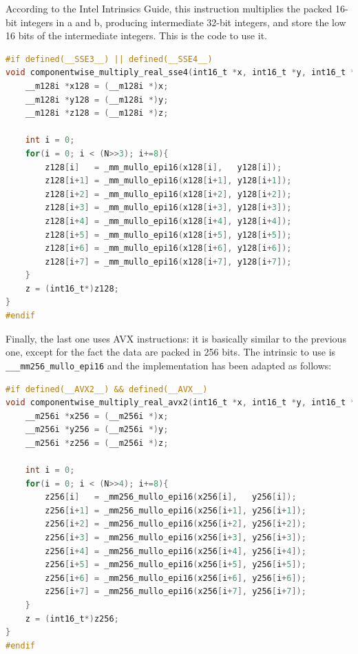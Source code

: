 \documentclass[paper=a4, fontsize=12pt]{scrartcl} %
\numberwithin{equation}{section}
\numberwithin{figure}{section}
\numberwithin{table}{section}
\begin{document}
According to the Intel Intrinsics Guide, this instruction multiplies the packed 16-bit integers
in a and b, producing intermediate 32-bit integers, and store the low 16 bits
of the intermediate integers.
This is the code to use it.
\newpage
\begin{lstlisting}[language=C, caption=SSE Implementation with 8-way loop unrolling]
#if defined(__SSE3__) || defined(__SSE4__)
void componentwise_multiply_real_sse4(int16_t *x, int16_t *y, int16_t *z, uint32_t N) {
    __m128i *x128 = (__m128i *)x;
    __m128i *y128 = (__m128i *)y;
    __m128i *z128 = (__m128i *)z;

    int i = 0;
    for(i = 0; i < (N>>3); i+=8){
        z128[i]   = _mm_mullo_epi16(x128[i],   y128[i]);
        z128[i+1] = _mm_mullo_epi16(x128[i+1], y128[i+1]);
        z128[i+2] = _mm_mullo_epi16(x128[i+2], y128[i+2]);
        z128[i+3] = _mm_mullo_epi16(x128[i+3], y128[i+3]);
        z128[i+4] = _mm_mullo_epi16(x128[i+4], y128[i+4]);
        z128[i+5] = _mm_mullo_epi16(x128[i+5], y128[i+5]);
        z128[i+6] = _mm_mullo_epi16(x128[i+6], y128[i+6]);
        z128[i+7] = _mm_mullo_epi16(x128[i+7], y128[i+7]);
    }
    z = (int16_t*)z128;
}
#endif
\end{lstlisting}

Finally, the last one uses AVX instructions: it is basically similar to the previous one, except
for the fact the data are packed in 256 bits. The intrinsic to use is \texttt{\_\_\_mm256\_mullo\_epi16}
and the implementation has been adapted as follows:
\begin{lstlisting}[language=C, caption=AVX2 Implementation with 8-way loop unrolling]
#if defined(__AVX2__) && defined(__AVX__)
void componentwise_multiply_real_avx2(int16_t *x, int16_t *y, int16_t *z, uint32_t N) {
    __m256i *x256 = (__m256i *)x;
    __m256i *y256 = (__m256i *)y;
    __m256i *z256 = (__m256i *)z;

    int i = 0;
    for(i = 0; i < (N>>4); i+=8){
        z256[i]   = _mm256_mullo_epi16(x256[i],   y256[i]);
        z256[i+1] = _mm256_mullo_epi16(x256[i+1], y256[i+1]);
        z256[i+2] = _mm256_mullo_epi16(x256[i+2], y256[i+2]);
        z256[i+3] = _mm256_mullo_epi16(x256[i+3], y256[i+3]);
        z256[i+4] = _mm256_mullo_epi16(x256[i+4], y256[i+4]);
        z256[i+5] = _mm256_mullo_epi16(x256[i+5], y256[i+5]);
        z256[i+6] = _mm256_mullo_epi16(x256[i+6], y256[i+6]);
        z256[i+7] = _mm256_mullo_epi16(x256[i+7], y256[i+7]);
    }
    z = (int16_t*)z256;
}
#endif
\end{lstlisting}
\end{document}

